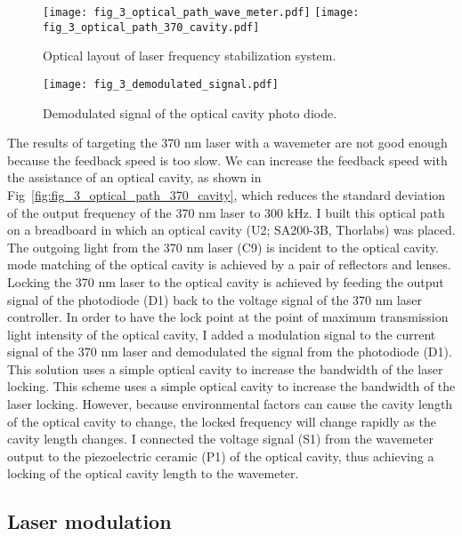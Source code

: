 \begin{figure}
    \centering
    {\texttt{[image: fig\_3\_optical\_path\_wave\_meter.pdf]}}
    {\texttt{[image: fig\_3\_optical\_path\_370\_cavity.pdf]}}
    \caption{Optical layout of laser frequency stabilization system.}
\end{figure}

\begin{figure}
    \centering
    \texttt{[image: fig\_3\_demodulated\_signal.pdf]}
    \caption{Demodulated signal of the optical cavity photo diode.}
\end{figure}

The results of targeting the 370 nm laser with a wavemeter are not good enough because the feedback speed is too slow. We can increase the feedback speed with the assistance of an optical cavity, as shown in Fig~\ref{fig:fig_3_optical_path_370_cavity}, which reduces the standard deviation of the output frequency of the 370 nm laser to 300 kHz. I built this optical path on a breadboard in which an optical cavity (U2; SA200-3B, Thorlabs) was placed. The outgoing light from the 370 nm laser (C9) is incident to the optical cavity. mode matching of the optical cavity is achieved by a pair of reflectors and lenses. Locking the 370 nm laser to the optical cavity is achieved by feeding the output signal of the photodiode (D1) back to the voltage signal of the 370 nm laser controller. In order to have the lock point at the point of maximum transmission light intensity of the optical cavity, I added a modulation signal to the current signal of the 370 nm laser and demodulated the signal from the photodiode (D1). This solution uses a simple optical cavity to increase the bandwidth of the laser locking. This scheme uses a simple optical cavity to increase the bandwidth of the laser locking. However, because environmental factors can cause the cavity length of the optical cavity to change, the locked frequency will change rapidly as the cavity length changes. I connected the voltage signal (S1) from the wavemeter output to the piezoelectric ceramic (P1) of the optical cavity, thus achieving a locking of the optical cavity length to the wavemeter.

\subsection{Laser modulation}


